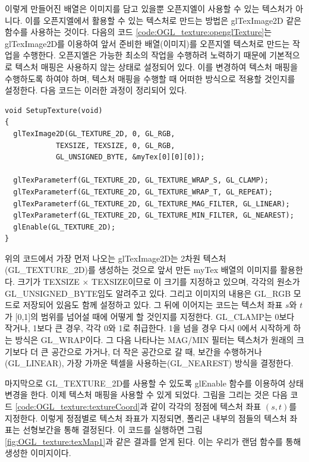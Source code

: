 이렇게 만들어진 배열은 이미지를 담고 있을뿐 오픈지엘이 사용할 수 있는 텍스처가 아니다. 이를 오픈지엘에서 활용할 수 있는 텍스처로 만드는 방법은 {\sf glTexImage2D} 같은 함수를 사용하는 것이다.
다음의 코드 \ref{code:OGL_texture:openglTexture}는 {\sf glTexImage2D}를 이용하여 앞서 준비한 배열(이미지)를 오픈지엘 텍스처로 만드는 작업을 수행한다. 오픈지엘은 가능한 최소의 작업을 수행하려 노력하기 때문에 기본적으로 텍스처 매핑은 사용하지 않는 상태로 설정되어 있다. 이를 변경하여 텍스처 매핑을 수행하도록 하여야 하며, 텍스처 매핑을 수행할 때 어떠한 방식으로 적용할 것인지를 설정한다. 다음 코드는 이러한 과정이 정리되어 있다.

\begin{algorithmbis}\label{code:OGL_texture:openglTexture}
\lstset{language=C++} 
\begin{lstlisting}
void SetupTexture(void) 
{
  glTexImage2D(GL_TEXTURE_2D, 0, GL_RGB, 
            TEXSIZE, TEXSIZE, 0, GL_RGB, 
            GL_UNSIGNED_BYTE, &myTex[0][0][0]);
	
  glTexParameterf(GL_TEXTURE_2D, GL_TEXTURE_WRAP_S, GL_CLAMP);
  glTexParameterf(GL_TEXTURE_2D, GL_TEXTURE_WRAP_T, GL_REPEAT);
  glTexParameterf(GL_TEXTURE_2D, GL_TEXTURE_MAG_FILTER, GL_LINEAR);
  glTexParameterf(GL_TEXTURE_2D, GL_TEXTURE_MIN_FILTER, GL_NEAREST);
  glEnable(GL_TEXTURE_2D);
}
\end{lstlisting}
\end{algorithmbis}

위의 코드에서 가장 먼저 나오는 {\sf glTexImage2D}는 2차원 텍스처 ({\sf GL\_TEXTURE\_2D})를 생성하는 것으로 앞서 만든 {\sf myTex} 배열의 이미지를 활용한다. 크기가 {\sf TEXSIZE} $\times$ {\sf TEXSIZE}이므로 이 크기를 지정하고 있으며, 각각의 원소가 {\sf GL\_UNSIGNED\_BYTE}임도 알려주고 있다. 그리고 이미지의 내용은 
{\sf GL\_RGB} 모드로 저장되어 있음도 함께 설정하고 있다.
그 뒤에 이어지는 코드는 텍스처 좌표 $s$와 $t$가 [0,1]의 범위를 넘어설 때에 어떻게 할 것인지를 지정한다. 
{\sf GL\_CLAMP}는 0보다 작거나, 1보다 큰 경우, 각각 0와 1로 취급한다. 1을 넘을 경우 다시 0에서 시작하게 하는 방식은 {\sf GL\_WRAP}이다.
그 다음 나타나는 {\sf MAG/MIN} 필터는 텍스처가 원래의 크기보다 더 큰 공간으로 가거나, 더 작은 공간으로 갈 때, 보간을 수행하거나({\sf GL\_LINEAR}), 가장 가까운 텍셀을 사용하는({\sf GL\_NEAREST}) 방식을 결정한다.

마지막으로 {\sf GL\_TEXTURE\_2D}를 사용할 수 있도록 glEnable 함수를 이용하여 상태 변경을 한다. 이제 텍스처 매핑을 사용할 수 있게 되었다.
그림을 그리는 것은 다음 코드 \ref{code:OGL_texture:textureCoord}과 같이 각각의 정점에 텍스처 좌표 $(s,t)$를 지정한다. 
이렇게 정점별로 텍스처 좌표가 지정되면, 폴리곤 내부의 점들의 텍스처 좌표는 선형보간을 통해 결정된다.
이 코드를 실행하면 그림 \ref{fig:OGL_texture:texMap1}과 같은 결과를 얻게 된다. 이는 우리가 랜덤 함수를 통해 생성한 이미지이다.

